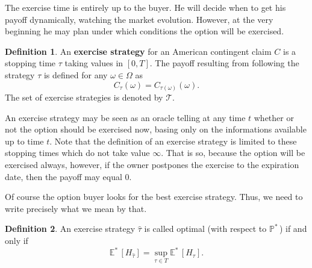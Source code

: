 \documentclass[a4paper,11pt, twoside]{book}
\theoremstyle{definition}
\newtheorem{mydef}{Definition}[chapter]
\theoremstyle{remark}
\def\Em{{\mathbb{E}^*}\,}
\def\Pm{{\mathbb{P}}^*\,}
\begin{document}
The exercise time is entirely up to the buyer. He will decide when to get his payoff dynamically, watching the market evolution. However, at the very beginning he may plan under which conditions the option will be exercised.
\begin{mydef}
 An \textbf{exercise strategy} for an American contingent claim $C$ is a stopping time $\tau$ taking values in $[0,T]$. The payoff resulting from following the strategy $\tau$ is defined for any $\omega \in \Omega$ as
 \[ C_{\tau}(\omega) = C_{\tau(\omega)}(\omega).\]
 The set of exercise strategies is denoted by $\mathcal{T}$. 
\end{mydef}
An exercise strategy may be seen as an oracle telling at any time $t$ whether or not the option should be exercised now, basing only on the informations available up to time $t$. Note that the definition of an exercise strategy is limited to these stopping times which do not take value $\infty$. That is so, because the option will be exercised always, however, if the owner postpones the exercise to the expiration date, then the payoff may equal 0.

Of course the option buyer looks for the best exercise strategy. Thus, we need to write precisely what we mean by that.
\begin{mydef}
 An exercise strategy $\hat{\tau}$ is called optimal (with respect to $\Pm$) if and only if
\begin{equation}
\label{eq:AM_optStrategy}
\Em[H_{\hat{\tau}}] = \sup\limits_{\tau \in T} \Em[H_{\tau}]. 
\end{equation}
\end{mydef}
\end{document}
